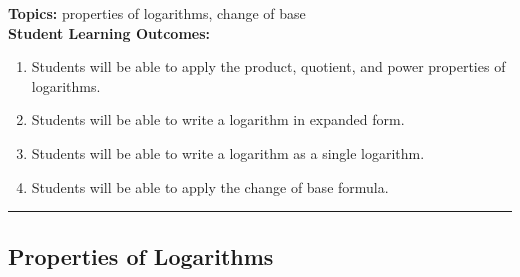

\noindent \textbf{Topics:}  properties of logarithms, change of base\\

\noindent \textbf{Student Learning Outcomes:}
\begin{enumerate}
\item Students will be able to apply the product, quotient, and power properties of logarithms.
\item Students will be able to write a logarithm in expanded form.
\item Students will be able to write a logarithm as a single logarithm.
\item Students will be able to apply the change of base formula.
\end{enumerate}

\hrule 

\bigskip

\subsection{Properties of Logarithms} ~


\noindent
{}


